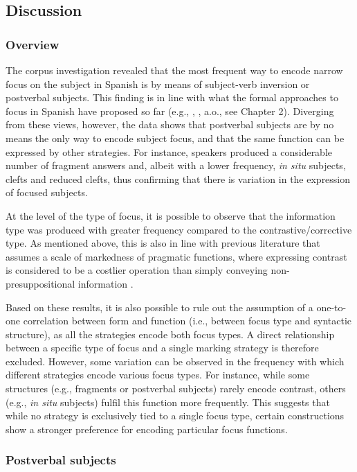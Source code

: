 \subsection{Discussion}
\subsubsection{Overview}
The corpus investigation revealed that the most frequent way to encode narrow focus on the subject in Spanish is by means of subject-verb inversion or postverbal subjects. This finding is in line with what the formal approaches to focus in Spanish have proposed so far (e.g., \cite{zubizarreta1998prosody}, \cite{gutierrez2013structural}, a.o., see Chapter 2). Diverging from these views, however, the data shows that postverbal subjects are by no means the only way to encode subject focus, and that the same function can be expressed by other strategies. For instance, speakers produced a considerable number of fragment answers and, albeit with a lower frequency, \textit{in situ} subjects, clefts and reduced clefts, thus confirming that there is variation in the expression of focused subjects.

At the level of the type of focus, it is possible to observe that the information type was produced with greater frequency compared to the contrastive/corrective type. As mentioned above, this is also in line with previous literature that assumes a scale of markedness of pragmatic functions, where expressing contrast is considered to be a costlier operation than simply conveying non-presuppositional information \parencite{zimmermann2008contrastive, skopeteas2010focus}.

Based on these results, it is also possible to rule out the assumption of a one-to-one correlation between form and function (i.e., between focus type and syntactic structure), as all the strategies encode both focus types. A direct relationship between a specific type of focus and a single marking strategy is therefore excluded.
However, some variation can be observed in the frequency with which different strategies encode various focus types. For instance, while some structures (e.g., fragments or postverbal subjects) rarely encode contrast, others (e.g., \textit{in situ} subjects) fulfil this function more frequently. This suggests that while no strategy is exclusively tied to a single focus type, certain constructions show a stronger preference for encoding particular focus functions.

\subsubsection{Postverbal subjects}

